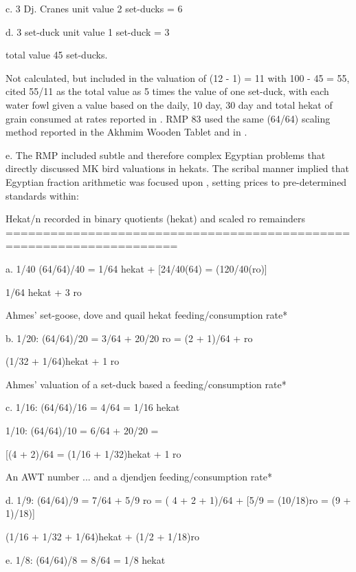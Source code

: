 \documentclass[12pt]{article}
\begin{document}
c. 3 Dj. Cranes unit value 2 set-ducks = 6

d. 3 set-duck unit value 1 set-duck = 3

total value 45 set-ducks. 

Not calculated, but included in the valuation of (12 - 1) = 11 with 100 - 45 = 55, cited 55/11 as the total value as 5 times the value of one set-duck, with each water fowl given a value based on the daily, 10 day, 30 day and total hekat of grain consumed at rates reported in . RMP 83 used the same (64/64) scaling method reported in the Akhmim Wooden Tablet and in .

e. The RMP included subtle and therefore complex Egyptian  problems that directly discussed MK bird valuations in hekats. The scribal manner implied that Egyptian fraction arithmetic was focused upon , setting prices to pre-determined standards within:

Hekat/n recorded in binary quotients (hekat) and scaled ro remainders
=====================================================================

a. 1/40 (64/64)/40 = 1/64 hekat + [24/40(64) = (120/40(ro)]   

1/64 hekat + 3 ro

Ahmes' set-goose, dove and quail hekat feeding/consumption rate*

b. 1/20: (64/64)/20 = 3/64 + 20/20 ro = (2 + 1)/64 + ro

(1/32 + 1/64)hekat + 1 ro 

Ahmes' valuation of a set-duck based a feeding/consumption rate*

c. 1/16: (64/64)/16 = 4/64 = 1/16 hekat

1/10: (64/64)/10 = 6/64 + 20/20 =

[(4 + 2)/64 = (1/16 + 1/32)hekat + 1 ro

An AWT number ... and a djendjen feeding/consumption rate*

d. 1/9: (64/64)/9 = 7/64 + 5/9 ro = ( 4 + 2 + 1)/64 + [5/9 = (10/18)ro = (9 + 1)/18)]

(1/16 + 1/32 + 1/64)hekat + (1/2 + 1/18)ro

e. 1/8: (64/64)/8 = 8/64 = 1/8 hekat
\end{document}
